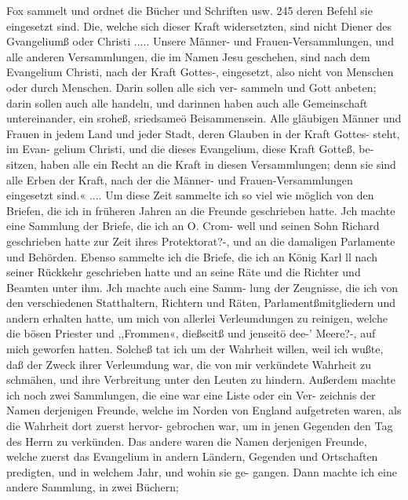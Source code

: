 Fox sammelt und ordnet die Bücher und Schriften usw. 245
deren Befehl sie eingesetzt sind. Die, welche sich dieser Kraft
widersetzten, sind nicht Diener des Gvangeliumß oder Christi .....
Unsere Männer- und Frauen-Versammlungen, und alle anderen
Versammlungen, die im Namen Jesu geschehen, sind nach dem
Evangelium Christi, nach der Kraft Gottes-, eingesetzt, also nicht
von Menschen oder durch Menschen. Darin sollen alle sich ver-
sammeln und Gott anbeten; darin sollen auch alle handeln, und
darinnen haben auch alle Gemeinschaft untereinander, ein sroheß,
sriedsameö Beisammensein.
Alle gläubigen Männer und Frauen in jedem Land und
jeder Stadt, deren Glauben in der Kraft Gottes- steht, im Evan-
gelium Christi, und die dieses Evangelium, diese Kraft Gotteß, be-
sitzen, haben alle ein Recht an die Kraft in diesen Versammlungen;
denn sie sind alle Erben der Kraft, nach der die Männer- und
Frauen-Versammlungen eingesetzt sind.« ....
Um diese Zeit sammelte ich so viel wie möglich von den
Briefen, die ich in früheren Jahren an die Freunde geschrieben
hatte. Jch machte eine Sammlung der Briefe, die ich an O. Crom-
well und seinen Sohn Richard geschrieben hatte zur Zeit ihres
Protektorat?-, und an die damaligen Parlamente und Behörden.
Ebenso sammelte ich die Briefe, die ich an König Karl ll nach
seiner Rückkehr geschrieben hatte und an seine Räte und die
Richter und Beamten unter ihm. Jch machte auch eine Samm-
lung der Zeugnisse, die ich von den verschiedenen Statthaltern,
Richtern und Räten, Parlamentßmitgliedern und andern erhalten
hatte, um mich von allerlei Verleumdungen zu reinigen, welche
die bösen Priester und ,,Frommen«, dießseitß und jenseitö dee-’
Meere?-, auf mich geworfen hatten. Solcheß tat ich um der
Wahrheit willen, weil ich wußte, daß der Zweck ihrer Verleumdung
war, die von mir verkündete Wahrheit zu schmähen, und ihre
Verbreitung unter den Leuten zu hindern. Außerdem machte ich
noch zwei Sammlungen, die eine war eine Liste oder ein Ver-
zeichnis der Namen derjenigen Freunde, welche im Norden von
England aufgetreten waren, als die Wahrheit dort zuerst hervor-
gebrochen war, um in jenen Gegenden den Tag des Herrn zu
verkünden. Das andere waren die Namen derjenigen Freunde,
welche zuerst das Evangelium in andern Ländern, Gegenden und
Ortschaften predigten, und in welchem Jahr, und wohin sie ge-
gangen. Dann machte ich eine andere Sammlung, in zwei Büchern;


